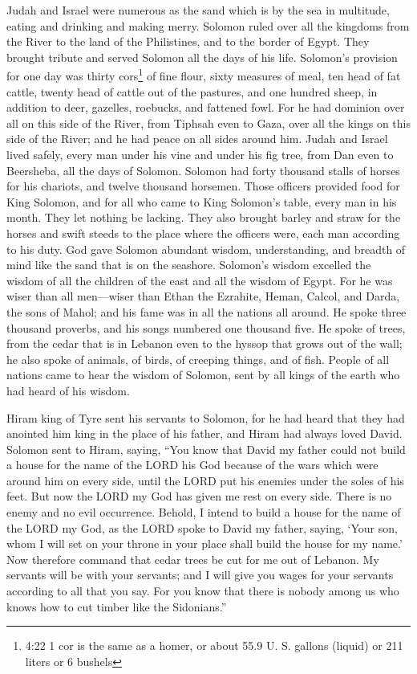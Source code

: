 \myverse{}Judah and Israel were numerous as the sand which is by the sea
in multitude, eating and drinking and making merry.
\myverse{}Solomon ruled over all the kingdoms from the River to the land of the Philistines,
and to the border of Egypt. They brought tribute and served Solomon all the days of his life.
\myverse{}Solomon’s provision for one day was thirty cors\footnote{4:22 1 cor is the same as a homer, or about 55.9 U. S. gallons (liquid) or 211 liters or 6 bushels}
of fine flour, sixty measures of meal,
\myverse{}ten head of fat cattle, twenty head of cattle out of the pastures, and one
hundred sheep, in addition to deer, gazelles, roebucks, and fattened fowl.
\myverse{}For he had dominion over all on this side of the River, from Tiphsah even
to Gaza, over all the kings on this side of the River; and he had peace on all sides around him.
\myverse{}Judah and Israel lived safely, every man under his vine and under his fig
tree, from Dan even to Beersheba, all the days of Solomon.
\myverse{}Solomon had forty thousand stalls of horses for his chariots, and twelve thousand
horsemen.
\myverse{}Those officers provided food for King Solomon, and for all who came to King
Solomon’s table, every man in his month. They let nothing be lacking.
\myverse{}They also brought barley and straw for the horses and swift steeds to the
place where the officers were, each man according to his duty.
\myverse{}God gave Solomon abundant wisdom, understanding, and breadth of mind like
the sand that is on the seashore.
\myverse{}Solomon’s wisdom excelled the wisdom of all the children of the east and all
the wisdom of Egypt.
\myverse{}For he was wiser than all men—wiser than Ethan the Ezrahite, Heman, Calcol,
and Darda, the sons of Mahol; and his fame was in all the nations all around.
\myverse{}He spoke three thousand proverbs, and his songs numbered one thousand five.
\myverse{}He spoke of trees, from the cedar that is in Lebanon even to the hyssop that
grows out of the wall; he also spoke of animals, of birds, of creeping things, and of fish.
\myverse{}People of all nations came to hear the wisdom of Solomon, sent by all kings
of the earth who had heard of his wisdom.


\mychapter{} \myverse*{}Hiram king of Tyre sent his servants to Solomon, for he had heard
that they had anointed him king in the place of his father, and Hiram had always loved David.
\myverse{}Solomon sent to Hiram, saying,
\myverse{}“You know that David my father could not build a house for the name of the LORD
his God because of the wars which were around him on every side, until the LORD put his enemies under
the soles of his feet.
\myverse{}But now the LORD my God has given me rest on every side. There is no enemy and
no evil occurrence.
\myverse{}Behold, I intend to build a house for the name of the LORD my God, as the LORD
spoke to David my father, saying, ‘Your son, whom I will set on your throne in your place shall build
the house for my name.’
\myverse{}Now therefore command that cedar trees be cut for me out of Lebanon. My servants
will be with your servants; and I will give you wages for your servants according to all that you say.
For you know that there is nobody among us who knows how to cut timber like the Sidonians.”

